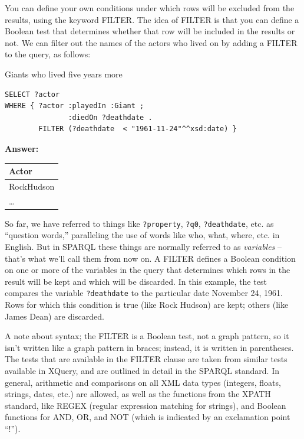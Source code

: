 You can define your own conditions under which rows will be excluded
from the results, using the keyword FILTER. The idea of FILTER is that
you can define a Boolean test that determines whether that row will be
included in the results or not. We can filter out the names of the
actors who lived on by adding a FILTER to the query, as follows:

\begin{query}Giants who lived five years more\end{query}

\begin{lstlisting}
SELECT ?actor
WHERE { ?actor :playedIn :Giant ;
               :diedOn ?deathdate . 
        FILTER (?deathdate  < "1961-11-24"^^xsd:date) }
\end{lstlisting}

\textbf{\textbf{Answer:}}

\begin{tabular}{|l|}
\hline
Actor\\
\hline
RockHudson\\
\ldots\\
\hline
\end{tabular}


So far, we have referred to things like \texttt{?property}, \texttt{?q0}, \texttt{?deathdate}, etc.
as ``question words,'' paralleling the use of words like who, what,
where, etc. in English. But in SPARQL these things are normally referred
to as \emph{variables} -- that's what we'll call them from now on. A
FILTER defines a Boolean condition on one or more of the variables in
the query that determines which rows in the result will be kept and
which will be discarded. In this example, the test compares the variable
\texttt{?deathdate} to the particular date November 24, 1961. Rows for which this
condition is true (like Rock Hudson) are kept; others (like James Dean)
are discarded.

A note about syntax; the FILTER is a Boolean test, not a graph pattern,
so it isn't written like a graph pattern in braces; instead, it is
written in parentheses. The tests that are available in the FILTER
clause are taken from similar tests available in XQuery, and are
outlined in detail in the SPARQL standard. \cite{Harris:13:SQL} In general, arithmetic and
comparisons on all XML data types (integers, floats, strings, dates,
etc.) are allowed, as well as the functions from the XPATH standard,  like REGEX (regular
expression matching for strings), and Boolean functions for AND, OR, and
NOT (which is indicated by an exclamation point ``!'').

